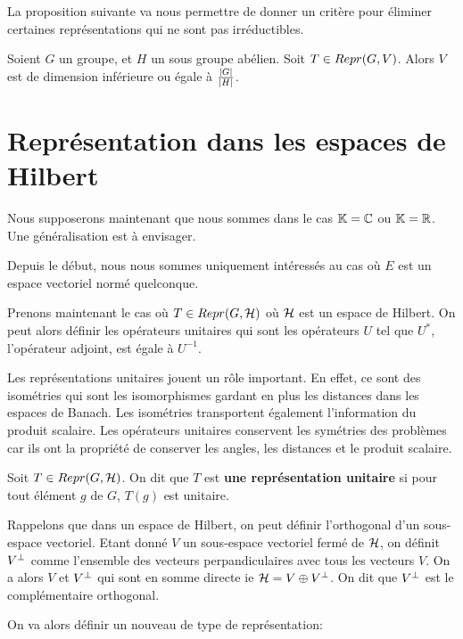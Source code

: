 La proposition suivante va nous permettre de donner un critère pour
éliminer certaines représentations qui ne sont pas irréductibles.

\begin{proposition}
	Soient $G$ un groupe, et $H$ un sous groupe abélien.
	Soit $T \in Repr(G, V)$.
	Alors $V$ est de dimension inférieure ou égale à
	$\frac{|G|}{|H|}$.
\end{proposition}

\section{Représentation dans les espaces de Hilbert}

Nous supposerons maintenant que nous sommes dans le cas $\mathbb{K} = \mathbb{C}$
ou $\mathbb{K} = \mathbb{R}$. Une généralisation est à envisager.

Depuis le début, nous nous sommes uniquement intéressés au cas où $E$ est un
espace vectoriel normé quelconque.

Prenons maintenant le cas où $T \in Repr(G, \mathcal{H})$ où $\mathcal{H}$ est un
espace de Hilbert.
On peut alors définir les opérateurs unitaires qui sont les opérateurs $U$ tel
que $U^{*}$, l'opérateur adjoint, est égale à $U^{-1}$.

Les représentations unitaires jouent un rôle important. En effet, ce sont des
isométries qui sont les isomorphismes gardant en plus les distances dans les
espaces de Banach. Les isométries transportent également l'information du
produit scalaire. Les opérateurs unitaires conservent les symétries des
problèmes car ils ont la propriété de conserver les angles, les distances et le
produit scalaire.

\begin{definition}
	Soit $T \in Repr(G, \mathcal{H})$. On dit que $T$ est \textbf{une
	représentation unitaire} si pour tout élément $g$ de $G$, $T(g)$ est unitaire.
\end{definition}

Rappelons que dans un espace de Hilbert, on peut définir l'orthogonal d'un
sous-espace vectoriel. Etant donné $V$ un sous-espace vectoriel fermé de $\mathcal{H}$,
on définit $V^{\perp}$ comme l'ensemble des vecteurs perpandiculaires avec
tous les vecteurs $V$. On a alors $V$ et $V^{\perp}$ qui sont en somme
directe ie $\mathcal{H} = V \oplus V^{\perp}$. On dit que $V^{\perp}$ est le
complémentaire orthogonal.

On va alors définir un nouveau de type de représentation:

